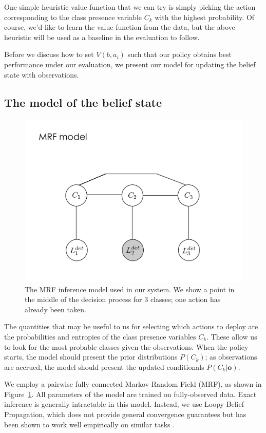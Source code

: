 One simple heuristic value function that we can try is simply picking the action corresponding to the class presence variable $C_k$ with the highest probability.
Of course, we'd like to learn the value function from the data, but the above heuristic will be used as a baseline in the evaluation to follow.

Before we discuss how to set $V(b,a_i)$ such that our policy obtains best performance under our evaluation, we present our model for updating the belief state with observations.

\subsection{The model of the belief state}
\begin{figure}[h!]
\centering
\includegraphics[width=0.56\linewidth]{../figures/inf_model_mrf_1.pdf}
\caption{
The MRF inference model used in our system.
We show a point in the middle of the decision process for 3 classes; one action has already been taken.
}
\label{fig:model}
\end{figure}

The quantities that may be useful to us for selecting which actions to deploy are the probabilities and entropies of the class presence variables $C_k$.
These allow us to look for the most probable classes given the observations.
When the policy starts, the model should present the prior distributions $P(C_k)$; as observations are accrued, the model should present the updated conditionals $P(C_k|\mathbf{o})$.

We employ a pairwise fully-connected Markov Random Field (MRF), as shown in Figure~\ref{fig:model}.
All parameters of the model are trained on fully-observed data.
Exact inference is generally intractable in this model.
Instead, we use Loopy Belief Propagation, which does not provide general convergence guarantees but has been shown to work well empirically on similar tasks \cite{Desai2009}.

